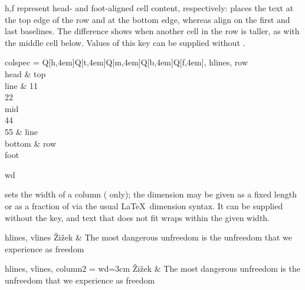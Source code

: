 \begin{codedescribe}[
    value,
    new=2021G,
    update=2021L
  ]{h,f}
   represent head- and foot-aligned cell content, respectively:  places the text at the top edge of the row and  at the bottom edge, whereas  align on the first and last baselines. The difference shows when another cell in the row is taller, as with the middle cell below. Values of this key can be supplied without .

  \begin{codestore}[st=columns:hf]
    \begin{tblr}{
      colspec = {Q[h,4em]Q[t,4em]Q[m,4em]Q[b,4em]Q[f,4em]},
      hlines,
      }
      {row \\head} & {top\\line} & {11\\22\\mid\\44\\55} & {line\\bottom} & {row\\foot}
    \end{tblr}\end{codestore}
  \begin{center}
  \end{center}
\end{codedescribe}

\begin{codedescribe}[
    key,
    new=2021B,
    update=2021L
  ]{wd}
  \begin{codesyntax}
  \end{codesyntax}
   sets the width of a column ( only); the dimension may be given as a fixed length or as a fraction of  via the usual \LaTeX\ dimension syntax. It can be supplied without the key, and text that does not fit wraps within the given width.

  \begin{codestore}[st=columns:wd]
    \begin{tblr}{hlines, vlines}
      Žižek & The most dangerous unfreedom is the unfreedom
      that we experience as freedom
    \end{tblr}

    \begin{tblr}{
        hlines, vlines,
        column{2} = {wd=3cm}
      }
      Žižek & The most dangerous unfreedom is the unfreedom
      that we experience as freedom
    \end{tblr}\end{codestore}
  \begin{center}
  \end{center}
\end{codedescribe}


